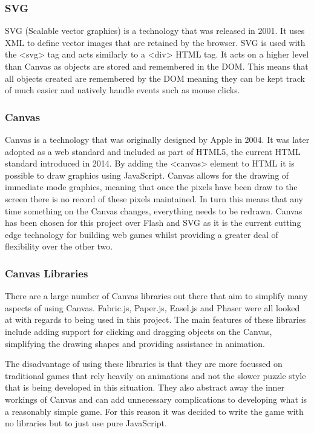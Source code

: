 \documentclass[12pt,a4paper]{report}
\begin{document}
\subsubsection{SVG}
SVG (Scalable vector graphics) is a technology that was released in 2001. 
It uses XML to define vector images that are retained by the browser. SVG is used with the <svg> tag and acts similarly to a <div> HTML tag. It acts on a higher level than Canvas as objects are stored and remembered in the DOM. This means that all objects created are remembered by the DOM meaning they can be kept track of much easier and natively handle events such as mouse clicks.

\subsubsection{Canvas}
Canvas is a technology that was originally designed by Apple in 2004. It was later adopted as a web standard and included as part of HTML5, the current HTML standard introduced in 2014. By adding the <canvas> element to HTML it is possible to draw graphics using JavaScript. Canvas allows for the drawing of immediate mode graphics, meaning that once the pixels have been draw to the screen there is no record of these pixels maintained. In turn this means that any time something on the Canvas changes, everything needs to be redrawn. Canvas has been chosen for this project over Flash and SVG as it is the current cutting edge technology for building web games whilst providing a greater deal of flexibility over the other two.

\subsubsection{Canvas Libraries}
There are a large number of Canvas libraries out there that aim to simplify many aspects of using Canvas. Fabric.js, Paper.js, Easel.js and Phaser were all looked at with regards to being used in this project. The main features of these libraries include adding support for clicking and dragging objects on the Canvas, simplifying the drawing shapes and providing assistance in animation.

The disadvantage of using these libraries is that they are more focussed on traditional games that rely heavily on animations and not the slower puzzle style that is being developed in this situation. They also abstract away the inner workings of Canvas and can add unnecessary complications to developing what is a reasonably simple game. For this reason it was decided to write the game with no libraries but to just use pure JavaScript.
\end{document}

